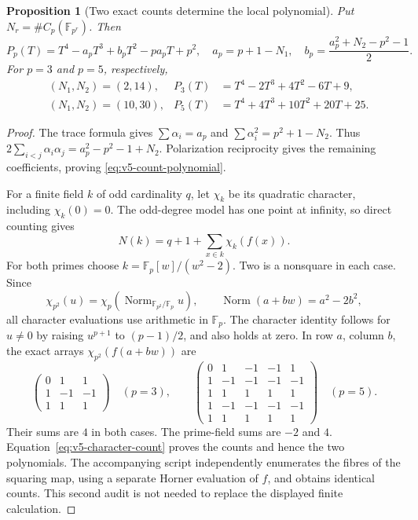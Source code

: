 \documentclass[11pt]{article}
\newtheorem{proposition}[proposition]{Proposition}
\theoremstyle{definition}
\theoremstyle{remark}
\newcommand{\F}{\mathbb F}
\begin{document}
\begin{proposition}[Two exact counts determine the local polynomial]
\label{prop:v5-polynomial-counts}
Put $N_r=\#C_p(\F_{p^r})$. Then
\begin{equation}
 \boxed{
 P_p(T)=T^4-a_pT^3+b_pT^2-pa_pT+p^2,\quad
 a_p=p+1-N_1,\quad b_p=\frac{a_p^2+N_2-p^2-1}{2}.}
 \label{eq:v5-count-polynomial}
\end{equation}
For $p=3$ and $p=5$, respectively,
\begin{align}
 &(N_1,N_2)=(2,14),&
 P_3(T)&=T^4-2T^3+4T^2-6T+9,\label{eq:v5-P3}\\
 &(N_1,N_2)=(10,30),&
 P_5(T)&=T^4+4T^3+10T^2+20T+25.\label{eq:v5-P5}
\end{align}
\end{proposition}
\begin{proof}
The trace formula gives $\sum\alpha_i=a_p$ and
$\sum\alpha_i^2=p^2+1-N_2$. Thus
$2\sum_{i<j}\alpha_i\alpha_j=a_p^2-p^2-1+N_2$.
Polarization reciprocity gives the remaining coefficients, proving
\eqref{eq:v5-count-polynomial}.

For a finite field $k$ of odd cardinality $q$, let $\chi_k$ be its quadratic
character, including $\chi_k(0)=0$. The odd-degree model has one point at
infinity, so direct counting gives
\begin{equation}
 N(k)=q+1+\sum_{x\in k}\chi_k(f(x)).
 \label{eq:v5-character-count}
\end{equation}
For both primes choose $k=\F_p[w]/(w^2-2)$. Two is a nonsquare in each
case. Since
\[
 \chi_{p^2}(u)=\chi_p(\operatorname{Norm}_{\F_{p^2}/\F_p}u),
 \qquad \operatorname{Norm}(a+bw)=a^2-2b^2,
\]
all character evaluations use arithmetic in $\F_p$. The character identity
follows for $u\ne0$ by raising $u^{p+1}$ to $(p-1)/2$, and also holds at
zero. In row $a$, column $b$, the exact arrays
$\chi_{p^2}(f(a+bw))$ are
\begin{equation}
 \begin{pmatrix}0&1&1\\1&-1&-1\\1&1&1\end{pmatrix}
 \quad(p=3),\qquad
 \begin{pmatrix}
 0&1&-1&-1&1\\
 1&-1&-1&-1&-1\\
 1&1&1&1&1\\
 1&-1&-1&-1&-1\\
 1&1&1&1&1
 \end{pmatrix}
 \quad(p=5).
 \label{eq:v5-character-arrays}
\end{equation}
Their sums are $4$ in both cases. The prime-field sums are $-2$ and $4$.
Equation~\eqref{eq:v5-character-count} proves the counts and hence the two
polynomials. The accompanying script independently enumerates the fibres
of the squaring map, using a separate Horner evaluation of $f$, and obtains
identical counts. This second audit is not needed to replace the displayed
finite calculation.
\end{proof}
\end{document}
